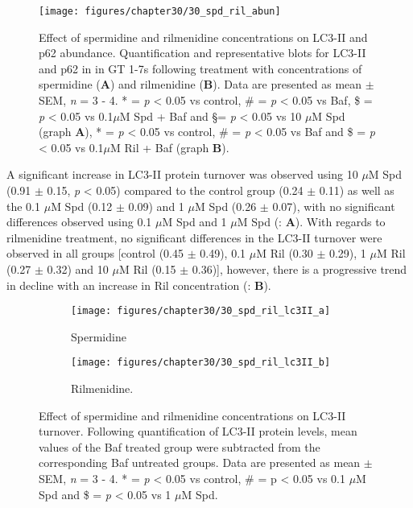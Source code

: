 {\begin{landscape}
\begin{figure}[!htbp]
\center
  \texttt{[image: figures/chapter30/30\_spd\_ril\_abun]}
  \caption[Effect of spermidine and rilmenidine concentrations on LC3-II and p62 abundance]{Effect of spermidine and rilmenidine concentrations on LC3-II and p62 abundance. Quantification and representative blots for LC3-II and p62 in in GT 1-7s following treatment with concentrations of spermidine (\textbf{A}) and rilmenidine (\textbf{B}). Data are presented as mean $\pm$ SEM, \textit{n} = 3 - 4. * = \textit{p} < 0.05 vs control, \# = \textit{p} < 0.05 vs Baf, \$ = \textit{p} < 0.05 vs 0.1$\mu$M Spd + Baf and \S = \textit{p} < 0.05 vs 10 $\mu$M Spd (graph \textbf{A}), * = \textit{p} < 0.05 vs control, \# = \textit{p} < 0.05 vs Baf and \$ = \textit{p} < 0.05 vs 0.1$\mu$M Ril + Baf (graph \textbf{B}).}
  \label{fig:30_spd_ril_abun}
\end{figure}
\end{landscape}

A significant increase in LC3-II protein turnover was observed using 10 $\mu$M Spd (0.91 $\pm$ 0.15, \textit{p} < 0.05) compared to the control group (0.24 $\pm$ 0.11) as well as the 0.1 $\mu$M Spd (0.12 $\pm$ 0.09) and 1 $\mu$M Spd (0.26 $\pm$ 0.07), with no significant differences observed using 0.1 $\mu$M Spd  and 1 $\mu$M Spd (: \textbf{A}). With regards to rilmenidine treatment, no significant differences in the LC3-II turnover were observed in all groups [control (0.45 $\pm$ 0.49), 0.1 $\mu$M Ril (0.30 $\pm$ 0.29), 1 $\mu$M Ril (0.27 $\pm$ 0.32) and 10 $\mu$M Ril (0.15 $\pm$ 0.36)], however, there is a progressive trend in decline with an increase in Ril concentration (: \textbf{B}). 

\begin{figure}[!htbp]
  \centering
  \begin{subfigure}[b]{0.495\linewidth}
    \texttt{[image: figures/chapter30/30\_spd\_ril\_lc3II\_a]}
    \caption{Spermidine}
  \end{subfigure}
  \begin{subfigure}[b]{0.495\linewidth}
    \texttt{[image: figures/chapter30/30\_spd\_ril\_lc3II\_b]}
    \caption{Rilmenidine.}
  \end{subfigure}
  \caption[Effect of spermidine and rilmenidine concentrations on LC3-II turnover]{Effect of spermidine and rilmenidine concentrations on LC3-II turnover. Following quantification of LC3-II protein levels, mean values of the Baf treated group were subtracted from the corresponding Baf untreated groups. Data are presented as mean $\pm$ SEM, \textit{n} = 3 - 4. * = \textit{p} < 0.05 vs control, \# = p < 0.05 vs 0.1 $\mu$M Spd and \$ = \textit{p} < 0.05 vs 1 $\mu$M Spd.}
  \label{fig:30_spd_ril_lc3ii}
\end{figure}

}

